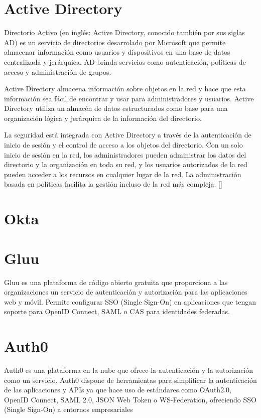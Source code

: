 \section{Active Directory}
Directorio Activo (en inglés: Active Directory, conocido también por sus siglas AD) es un servicio de directorios desarrolado por Microsoft que permite almacenar información como usuarios y dispositivos en una base de datos centralizada y jerárquica. AD brinda servicios como autenticación, políticas de acceso y administración de grupos.

Active Directory almacena información sobre objetos en la red y hace que esta información sea fácil de encontrar y usar para administradores y usuarios. Active Directory utiliza un almacén de datos estructurados como base para una organización lógica y jerárquica de la información del directorio.

La seguridad está integrada con Active Directory a través de la autenticación de inicio de sesión y el control de acceso a los objetos del directorio. Con un solo inicio de sesión en la red, los administradores pueden administrar los datos del directorio y la organización en toda su red, y los usuarios autorizados de la red pueden acceder a los recursos en cualquier lugar de la red. La administración basada en políticas facilita la gestión incluso de la red más compleja.
[\cite{active-directoy-doc}]



\section{Okta}

\section{Gluu}
Gluu es una plataforma de código abierto gratuita que proporciona a las organizaciones un servicio de autenticación y autorización para las aplicaciones web y móvil. Permite configurar SSO (Single Sign-On) en aplicaciones que tengan soporte para OpenID Connect, SAML o  CAS para identidades federadas.

\section{Auth0}
Auth0 es una plataforma en la nube que ofrece la autenticación y la autorización como un servicio. Auth0 dispone de herramientas para simplificar la autenticación de las aplicaciones y APIs ya que hace uso de estándares como OAuth2.0, OpenID Connect, SAML 2.0, JSON Web Token o WS-Federation, ofreciendo SSO (Single Sign-On) a entornos empresariales

